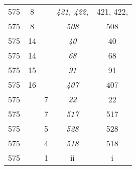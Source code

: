 \documentclass[a4paper,11pt]{article}
\begin{document}
\begin{center}
\begin{tabular}{|c|c|c|c|c|}
    575 &  8 & & \emph{421, 422,} & 421, 422, \\
    575 &  8 & & \emph{508} & 508 \\
    575 & 14 & & \emph{40} & 40 \\
    575 & 14 & & \emph{68} & 68 \\
    575 & 15 & & \emph{91} & 91 \\
    575 & 16 & & \emph{407} & 407 \\
    575 & &  7 & \emph{22} & 22 \\
    575 & &  7 & \emph{517} & 517 \\
    575 & &  5 & \emph{528} & 528 \\
    575 & &  4 & \emph{518} & 518 \\
    575 & &  1 & ii & i \\
    \hline
  \end{tabular}






\end{center}
\end{document}
